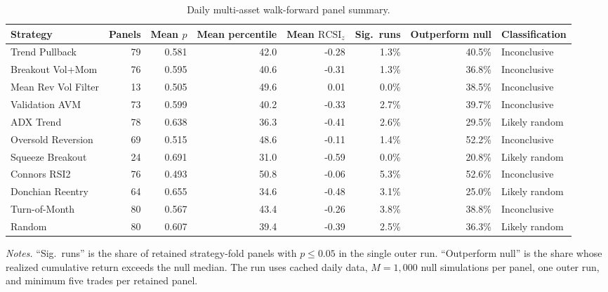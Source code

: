 \documentclass[preprint,12pt]{elsarticle}
\theoremstyle{definition}
\begin{document}
\begin{table}[H]
\centering
\caption{Daily multi-asset walk-forward panel summary.}
\label{tab:multi_asset_walk_forward}
{\small
\renewcommand{\arraystretch}{1.12}
\begin{adjustbox}{max width=\textwidth}
\begin{tabular}{@{}lrrrrrrl@{}}
\toprule
Strategy & Panels & Mean $p$ & Mean percentile & Mean $\mathrm{RCSI}_z$ & Sig.\ runs & Outperform null & Classification \\
\midrule
Trend Pullback      & 79 & 0.581 & 42.0 & -0.28 & 1.3\% & 40.5\% & Inconclusive \\
Breakout Vol+Mom    & 76 & 0.595 & 40.6 & -0.31 & 1.3\% & 36.8\% & Inconclusive \\
Mean Rev Vol Filter & 13 & 0.505 & 49.6 & \phantom{-}0.01 & 0.0\% & 38.5\% & Inconclusive \\
Validation AVM      & 73 & 0.599 & 40.2 & -0.33 & 2.7\% & 39.7\% & Inconclusive \\
ADX Trend           & 78 & 0.638 & 36.3 & -0.41 & 2.6\% & 29.5\% & Likely random \\
Oversold Reversion  & 69 & 0.515 & 48.6 & -0.11 & 1.4\% & 52.2\% & Inconclusive \\
Squeeze Breakout    & 24 & 0.691 & 31.0 & -0.59 & 0.0\% & 20.8\% & Likely random \\
Connors RSI2        & 76 & 0.493 & 50.8 & -0.06 & 5.3\% & 52.6\% & Inconclusive \\
Donchian Reentry    & 64 & 0.655 & 34.6 & -0.48 & 3.1\% & 25.0\% & Likely random \\
Turn-of-Month       & 80 & 0.567 & 43.4 & -0.26 & 3.8\% & 38.8\% & Inconclusive \\
Random              & 80 & 0.607 & 39.4 & -0.39 & 2.5\% & 36.3\% & Likely random \\
\bottomrule
\end{tabular}
\end{adjustbox}
}
\par\vspace{0.5em}
\begin{minipage}{0.95\textwidth}
\centering
\footnotesize\emph{Notes.} ``Sig.\ runs'' is the share of retained strategy-fold panels with $p\le0.05$ in the single outer run. ``Outperform null'' is the share whose realized cumulative return exceeds the null median. The run uses cached daily data, $M=1{,}000$ null simulations per panel, one outer run, and minimum five trades per retained panel.
\end{minipage}
\end{table}
\end{document}
